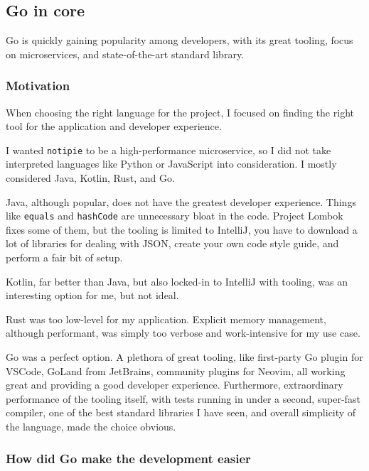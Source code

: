 \subsection{Go in core}\label{go-in-core}

Go is quickly gaining popularity among developers,
with its great tooling, focus on microservices,
and state-of-the-art standard library.

\subsubsection{Motivation}\label{motivation}

When choosing the right language for the project,
I focused on finding the right tool
for the application and developer experience.

I wanted \texttt{notipie} to be a high-performance microservice,
so I did not take interpreted languages
like Python or JavaScript into consideration.
I mostly considered Java, Kotlin, Rust, and Go.

Java, although popular, does not have the greatest developer experience.
Things like \texttt{equals} and \texttt{hashCode}
are unnecessary bloat in the code.
Project Lombok~\cite{zwitserloot_project_2022} fixes some of them,
but the tooling is limited to IntelliJ,
you have to download a lot of libraries for dealing with JSON,
create your own code style guide,
and perform a fair bit of setup.

Kotlin, far better than Java,
but also locked-in to IntelliJ with tooling,
was an interesting option for me, but not ideal.

Rust was too low-level for my application.
Explicit memory management, although performant,
was simply too verbose and work-intensive for my use case.

Go was a perfect option.
A plethora of great tooling,
like first-party Go plugin for VSCode, GoLand from JetBrains,
community plugins for Neovim,
all working great and providing a good developer experience.
Furthermore, extraordinary performance of the tooling itself,
with tests running in under a second, super-fast compiler,
one of the best standard libraries I have seen,
and overall simplicity of the language, made the choice obvious.

\subsubsection{How did Go make the development easier}\label{how-did-go-make-the-development-easier}

